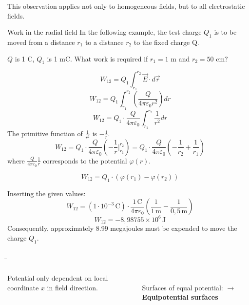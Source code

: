 \begin{frame}
{	This observation applies not only to homogeneous fields, but to all electrostatic fields.



	
	


	\begin{expl}{Work in the radial field}{}
		In the following example, the test charge $Q_1$ is to be moved from a distance $r_1$ to a distance $r_2$ to the fixed charge Q.

		\begin{center}
			
		\end{center}

		
		
		

		$Q$ is 1 C, $Q_1$ is 1 mC. What work is required if $r_1 = 1$ m and $r_2 = 50$ cm?

		\[
W_{12} = Q_1 \int_{r_1}^{r_2} \vec{E} \cdot d\vec{r}
\]
\[
W_{12} = Q_1 \int_{r_1}^{r_2} \left( \frac{Q}{4 \pi \varepsilon_0 r^2} \right) dr
\]
\[
W_{12} = Q_1 \cdot \frac{Q}{4 \pi \varepsilon_0} \int_{r_1}^{r_2} \frac{1}{r^2} dr
\]
The primitive function of $\frac{1}{r^2}$ is $-\frac{1}{r}$.
\[
W_{12} = Q_1 \cdot \frac{Q}{4 \pi \varepsilon_0} \left( -\frac{1}{r} \bigg|_{r_1}^{r_2} \right) = Q_1 \cdot \frac{Q}{4 \pi \varepsilon_0} \left( -\frac{1}{r_2} + \frac{1}{r_1} \right)
\]
where $\frac{Q}{4 \pi \varepsilon_0} \frac{1}{r}$ corresponds to the potential $\varphi(r)$.

\[
W_{12} = Q_1 \cdot (\varphi(r_1) - \varphi(r_2))
\]

Inserting the given values:
\[
W_{12} = (1 \cdot 10^{-3} \, \text{C}) \cdot \frac{1 \, \text{C}}{4 \pi \varepsilon_0} \left( \frac{1}{1 \, \text{m}} - \frac{1}{0{,}5 \, \text{m}} \right)
\]
\[
W_{12} = -8,98755 \times 10^{6} \, \text{J}
\]
Consequently, approximately 8.99 megajoules must be expended to move the charge $Q_1$.
 
	\end{expl}	


	}

	\b{

	\begin{columns}
		Potential only dependent on local coordinate $x$ in field direction.

		\phantom{.}\\

		Surfaces of equal potential: $\rightarrow$ \textbf{Equipotential surfaces}


\end{columns}}
\end{frame}
